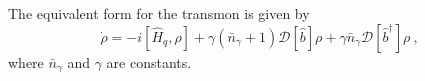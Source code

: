 \documentclass[10pt,a4paper,fleqn]{article}
\newcommand{\hamH}{\hat{H}}
\newcommand{\tranOp}{\hat{b}}
\newcommand{\dissOp}{\mathcal{D}}
\begin{document}
The equivalent form for the transmon is given by
\begin{equation}\label{eq:masterEqTran}\tag{79} %
	\dot{\rho} = -i[\hamH_q, \rho] + \gamma(\bar{n}_\gamma + 1)\dissOp[\tranOp]\rho + \gamma\bar{n}_\gamma\dissOp[\tranOp^\dag]\rho \ ,
\end{equation}
where $ \bar{n}_\gamma $ and $ \gamma $ are constants.


	
\end{document}
